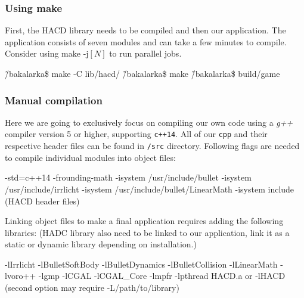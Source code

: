 \subsubsection*{Using make}
First,  the HACD library needs to be compiled and then our application. The application consists of seven modules and can take a few minutes to compile. Consider using make -j$[N]$ to run parallel jobs.
\begin{code}
\~/bakalarka\$ make -C lib/hacd/
\~/bakalarka\$ make
\~/bakalarka\$ build/game
\end{code}

\subsubsection*{Manual compilation}
Here we are going to exclusively focus on compiling our own code using a \emph{g++} compiler version 5 or higher, supporting {\tt c++14}. All of our {\tt cpp} and their respective header files can be found in {\tt /src} directory.
Following flags are needed to compile individual modules into object files:
\begin{code}
-std=c++14
-frounding-math
-isystem /usr/include/bullet 
-isystem /usr/include/irrlicht 
-isystem /usr/include/bullet/LinearMath 
-isystem include (HACD header files)
\end{code}

Linking object files to make a final application requires adding the following libraries: (HADC library also need to be linked to our application, link it as a static or dynamic library depending on installation.)
\begin{code}
-lIrrlicht 
-lBulletSoftBody 
-lBulletDynamics 
-lBulletCollision    
-lLinearMath 
-lvoro++ 
-lgmp 
-lCGAL 
-lCGAL_Core 
-lmpfr 
-lpthread
HACD.a or -lHACD (second option may require -L/path/to/library)
\end{code}













